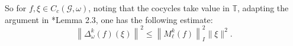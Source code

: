 \documentclass[a4paper,11pt,reqno]{amsart}
\theoremstyle{plain}
\theoremstyle{mainthmstyle}
\theoremstyle{named}
\numberwithin{equation}{section}
\newcommand{\Bea}{\begin{eqnarray*}}
\newcommand{\Eea}{\end{eqnarray*}}
\begin{document}
So for $f, \xi \in C_c (\mathcal G, \omega)$, noting that the cocycles take value in $\mathbb{T}$, adapting the argument in \cite{joardar2025metrics}*{Lemma 2.3}, one has the following estimate:
\begin{equation*}
 \left \|\Delta_{\omega}^k (f) (\xi) \right \|^2\leq \left \|M_{\ell}^k (f) \right \|_{I}^2 \|\xi\|^2.    
\end{equation*}

\vspace{5mm}
\end{document}
